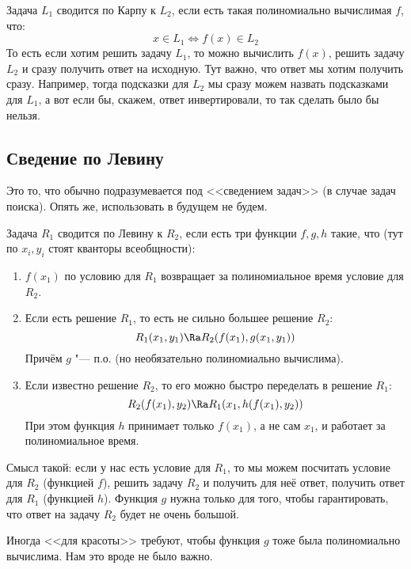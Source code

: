 	Задача $L_1$ сводится по Карпу к $L_2$, если есть такая полиномиально вычислимая $f$, что:
	\[ x \in L_1 \iff f(x) \in L_2 \]
	То есть если хотим решить задачу $L_1$, то можно вычислить $f(x)$, решить задачу $L_2$ и сразу получить ответ на исходную.
	Тут важно, что ответ мы хотим получить сразу.
	Например, тогда подсказки для $L_2$ мы сразу можем назвать подсказками для $L_1$, а вот если бы, скажем, ответ инвертировали, то так сделать было бы нельзя.

\subsection{Сведение по Левину}
	Это то, что обычно подразумевается под <<сведением задач>> (в случае задач поиска).
	Опять же, использовать в будущем не будем.

	Задача $R_1$ сводится по Левину к $R_2$, если есть три функции $f, g, h$ такие, что (тут по $x_i, y_i$ стоят кванторы всеобщности):
	\begin{enumerate}
		\item $f(x_1)$ по условию для $R_1$ возвращает за полиномиальное время условие для $R_2$.
		\item Если есть решение $R_1$, то есть не сильно большее решение $R_2$:
			\[ R_1(x_1, y_1) \Ra R_2(f(x_1), g(x_1, y_1)) \]
			Причём $g$ "--- п.о. (но необязательно полиномиально вычислима).
		\item Если известно решение $R_2$, то его можно быстро переделать в решение $R_1$: 
			\[ R_2(f(x_1), y_2) \Ra R_1(x_1, h(f(x_1), y_2)) \]
			При этом функция $h$ принимает только $f(x_1)$, а не сам $x_1$, и работает за полиномиальное время.
	\end{enumerate}
	\begin{Rem}
		Смысл такой: если у нас есть условие для $R_1$, то мы можем посчитать условие для $R_2$ (функцией $f$), решить задачу $R_2$ и получить для неё ответ,
		получить ответ для $R_1$ (функцией $h$).
		Функция $g$ нужна только для того, чтобы гарантировать, что ответ на задачу $R_2$ будет не очень большой.
	\end{Rem}
	\begin{Rem}
		Иногда <<для красоты>> требуют, чтобы функция $g$ тоже была полиномиально вычислима.
		Нам это вроде не было важно.
	\end{Rem}

